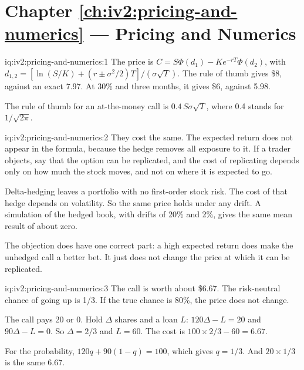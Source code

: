 \section*{Chapter \ref{ch:iv2:pricing-and-numerics} --- Pricing and Numerics}

\begin{solution}{iq:iv2:pricing-and-numerics:1}
The price is $C = S\Phi(d_1) - Ke^{-rT}\Phi(d_2)$, with $d_{1,2} = [\ln(S/K) + (r \pm \sigma^2/2)T]/(\sigma\sqrt T)$. The rule of thumb gives \$8, against an exact 7.97. At 30\% and three months, it gives \$6, against 5.98.

The rule of thumb for an at-the-money call is $0.4\,S\sigma\sqrt T$, where 0.4 stands for $1/\sqrt{2\pi}$.

\end{solution}

\begin{solution}{iq:iv2:pricing-and-numerics:2}
They cost the same. The expected return does not appear in the formula, because the hedge removes all exposure to it. If a trader objects, say that the option can be replicated, and the cost of replicating depends only on how much the stock moves, and not on where it is expected to go.

Delta-hedging leaves a portfolio with no first-order stock risk. The cost of that hedge depends on volatility. So the same price holds under any drift. A simulation of the hedged book, with drifts of 20\% and 2\%, gives the same mean result of about zero.

The objection does have one correct part: a high expected return does make the unhedged call a better bet. It just does not change the price at which it can be replicated.

\end{solution}

\begin{solution}{iq:iv2:pricing-and-numerics:3}
The call is worth about \$6.67. The risk-neutral chance of going up is 1/3. If the true chance is 80\%, the price does not change.

The call pays 20 or 0. Hold $\Delta$ shares and a loan $L$: $120\Delta - L = 20$ and $90\Delta - L = 0$. So $\Delta = 2/3$ and $L = 60$. The cost is $100 \times 2/3 - 60 = 6.67$.

For the probability, $120q + 90(1 - q) = 100$, which gives $q = 1/3$. And $20 \times 1/3$ is the same 6.67.

\end{solution}

